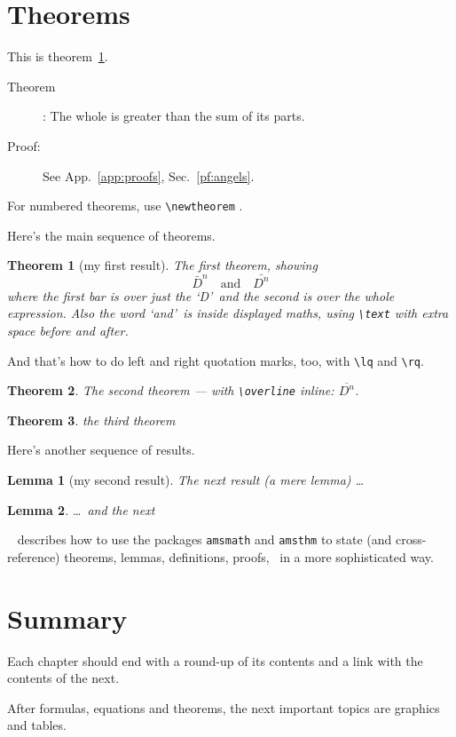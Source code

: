 \section{Theorems}\label{angels}
This is theorem~\ref{angels}.
\begin{description}
\item[Theorem]: The whole is greater than the sum of its parts.
\item[Proof:] See App.~\ref{app:proofs}, Sec.~\ref{pf:angels}.
\end{description}
For numbered theorems, use \verb+\newtheorem+ \cite[Sec.~3.8]{NSS}.
\par
Here's the main sequence of theorems.
\newtheorem{Main}{Theorem} %
\begin{Main}[my first result]
The first theorem, showing
\[ \bar D^n\quad\text{and}\quad\bar{D^n} \]
where the first bar is over just the \lq D\rq\ and the second is over
the whole expression. Also the word \lq and\rq\ is inside displayed
maths, using \verb+\text+ with extra space before and after.
\end{Main}And that's how to do left and right quotation marks, too,
with \verb+\lq+ and \verb+\rq+.
\begin{Main}
The second theorem --- with \verb+\overline+ inline: $\overline{D^n}$.
\end{Main}
\begin{Main} the third theorem\end{Main}
Here's another sequence of results.
\newtheorem{second}{Lemma} %
\begin{second}[my second result]
The next result (a mere lemma) \dots\end{second}
\begin{second}\dots\ and the next\end{second}
\comp\ \cite[Sec.~3.3.3]{MG} describes how to use the
packages \texttt{amsmath} and \texttt{amsthm} to state (and
cross-reference) theorems, lemmas, definitions, proofs, \etc\ in a more 
sophisticated way.
%
\section{Summary}
Each chapter should end with a round-up of its contents and a link
with the contents of the next.
\par
After formulas, equations and theorems, the next important
topics are graphics and tables.

